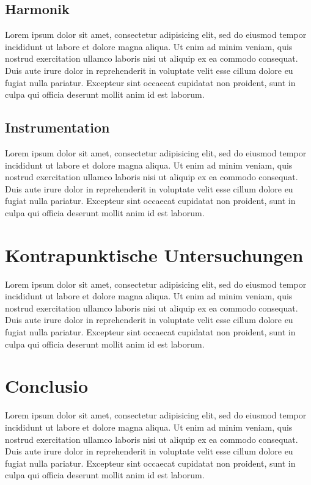 \subsection{Harmonik}

Lorem ipsum dolor sit amet, consectetur adipisicing elit, sed do eiusmod tempor incididunt ut labore et dolore magna aliqua. Ut enim ad minim veniam, quis nostrud exercitation ullamco laboris nisi ut aliquip ex ea commodo consequat. Duis aute irure dolor in reprehenderit in voluptate velit esse cillum dolore eu fugiat nulla pariatur. Excepteur sint occaecat cupidatat non proident, sunt in culpa qui officia deserunt mollit anim id est laborum.

\subsection{Instrumentation}

Lorem ipsum dolor sit amet, consectetur adipisicing elit, sed do eiusmod tempor incididunt ut labore et dolore magna aliqua. Ut enim ad minim veniam, quis nostrud exercitation ullamco laboris nisi ut aliquip ex ea commodo consequat. Duis aute irure dolor in reprehenderit in voluptate velit esse cillum dolore eu fugiat nulla pariatur. Excepteur sint occaecat cupidatat non proident, sunt in culpa qui officia deserunt mollit anim id est laborum.



\section{Kontrapunktische Untersuchungen}

Lorem ipsum dolor sit amet, consectetur adipisicing elit, sed do eiusmod tempor incididunt ut labore et dolore magna aliqua. Ut enim ad minim veniam, quis nostrud exercitation ullamco laboris nisi ut aliquip ex ea commodo consequat. Duis aute irure dolor in reprehenderit in voluptate velit esse cillum dolore eu fugiat nulla pariatur. Excepteur sint occaecat cupidatat non proident, sunt in culpa qui officia deserunt mollit anim id est laborum.



\section{Conclusio}

Lorem ipsum dolor sit amet, consectetur adipisicing elit, sed do eiusmod tempor incididunt ut labore et dolore magna aliqua. Ut enim ad minim veniam, quis nostrud exercitation ullamco laboris nisi ut aliquip ex ea commodo consequat. Duis aute irure dolor in reprehenderit in voluptate velit esse cillum dolore eu fugiat nulla pariatur. Excepteur sint occaecat cupidatat non proident, sunt in culpa qui officia deserunt mollit anim id est laborum.
